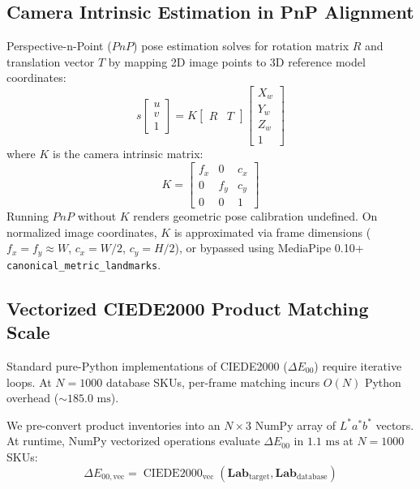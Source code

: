 \documentclass[conference]{IEEEtran}
\begin{document}
\subsection{Camera Intrinsic Estimation in PnP Alignment}
Perspective-n-Point ($PnP$) pose estimation solves for rotation matrix $R$ and translation vector $T$ by mapping 2D image points to 3D reference model coordinates:
\begin{equation}
s \begin{bmatrix} u \\ v \\ 1 \end{bmatrix} = K \begin{bmatrix} R & T \end{bmatrix} \begin{bmatrix} X_w \\ Y_w \\ Z_w \\ 1 \end{bmatrix}
\end{equation}
where $K$ is the camera intrinsic matrix:
\begin{equation}
K = \begin{bmatrix} f_x & 0 & c_x \\ 0 & f_y & c_y \\ 0 & 0 & 1 \end{bmatrix}
\end{equation}
Running $PnP$ without $K$ renders geometric pose calibration undefined. On normalized image coordinates, $K$ is approximated via frame dimensions ($f_x = f_y \approx W$, $c_x = W/2$, $c_y = H/2$), or bypassed using MediaPipe 0.10+ \texttt{canonical\_metric\_landmarks}.

\subsection{Vectorized CIEDE2000 Product Matching Scale}
Standard pure-Python implementations of CIEDE2000 ($\Delta E_{00}$) require iterative loops. At $N = 1000$ database SKUs, per-frame matching incurs $O(N)$ Python overhead ($\sim 185.0\text{ ms}$). 

We pre-convert product inventories into an $N \times 3$ NumPy array of $L^*a^*b^*$ vectors. At runtime, NumPy vectorized operations evaluate $\Delta E_{00}$ in $1.1\text{ ms}$ at $N = 1000$ SKUs:
\begin{equation}
\Delta E_{00, \text{vec}} = \operatorname{CIEDE2000}_{\text{vec}}(\mathbf{Lab}_{\text{target}}, \mathbf{Lab}_{\text{database}})
\end{equation}
\end{document}
